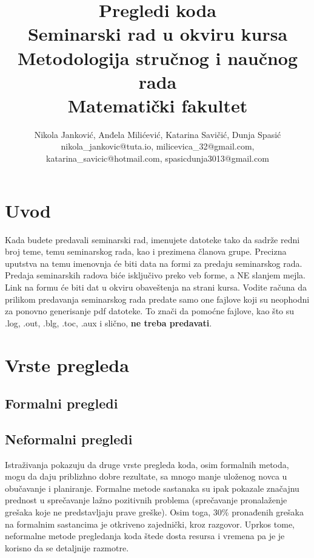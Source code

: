 \documentclass[a4paper]{article}
\begin{document}
\title{Pregledi koda\\ \small{Seminarski rad u okviru kursa\\Metodologija stručnog i naučnog rada\\ Matematički fakultet}}

\author{Nikola Janković, Anđela Milićević, Katarina Savičić, Dunja Spasić\\ 
nikola\_jankovic@tuta.io, milicevica\_32@gmail.com, \\
katarina\_savicic@hotmail.com, spasicdunja3013@gmail.com}


\maketitle

\abstract{}

\tableofcontents

\newpage

\section{Uvod}
\label{sec:uvod}

Kada budete predavali seminarski rad, imenujete datoteke tako da sadrže redni broj teme, temu seminarskog rada, kao i prezimena članova grupe. Precizna uputstva na temu imenovnja će biti data na formi za predaju seminarskog rada. Predaja seminarskih radova biće isključivo preko veb forme, a NE slanjem mejla. Link na formu će biti dat u okviru obaveštenja na strani kursa. Vodite računa da prilikom predavanja seminarskog rada predate samo one fajlove koji su neophodni za ponovno generisanje pdf datoteke. To znači da pomoćne fajlove, kao što su .log, .out, .blg, .toc, .aux i slično, \textbf{ne treba predavati}.



\section{Vrste pregleda}
	\subsection{Formalni pregledi}
	\subsection{Neformalni pregledi}
	Istraživanja pokazuju da druge vrste pregleda koda, osim formalnih metoda, mogu da daju priblizhno dobre rezultate, sa mnogo manje uloženog novca u obučavanje i planiranje. Formalne metode sastanaka su ipak pokazale značajnu prednost u sprečavanje lažno pozitivnih problema (sprečavanje pronalaženje grešaka koje ne predstavljaju prave greške). Osim toga, 30\% pronađenih grešaka na formalnim sastancima je otkriveno zajednički, kroz razgovor.\cite{Johnson98doesevery} Uprkos tome, neformalne metode pregledanja koda štede dosta resursa i vremena pa je je korisno da se detaljnije razmotre.
	
\end{document}
